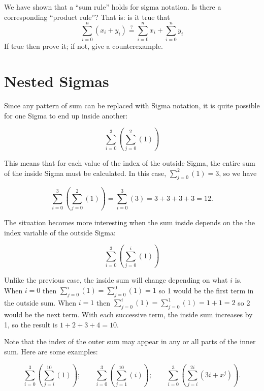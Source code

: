 \begin {exercise}{}
We have shown that a ``sum rule'' holds for sigma notation.  Is there a corresponding ``product rule''? That is: is it true that
\[ \sum_{i=0}^n \left(x_i +y_i \right) \stackrel{?}{=} \sum_{i=0}^n x_i + \sum_{i=0}^n y_i \]
If true then prove it; if not, give a counterexample.
\end{exercise}


\section{Nested Sigmas}
Since any pattern of sum can be replaced with Sigma notation, it is quite possible for one Sigma to end up inside another:

\[\sum_{i=0}^{3}\left( \sum_{j=0}^{2}(1)\right)\]

This means that for each value of the index of the outside Sigma, the entire sum of the inside Sigma must be calculated.  In this case, $\sum_{j=0}^{2}(1)=3$, so we have

\[\sum_{i=0}^{3}\left( \sum_{j=0}^{2}(1)\right) =  \sum_{i=0}^{3}\left( 3 \right) = 3+3+3+3 = 12. \]

The situation becomes more interesting when the sum inside depends on the the index variable of the outside Sigma:

\[\sum_{i=0}^{3}\left(\sum_{j=0}^{i}(1)\right)\]

Unlike the previous case, the inside sum will change depending on what $i$ is.  When $i=0$ then $\sum_{j=0}^{i}(1)=\sum_{j=0}^{0}(1)=1$ so 1 would be the first term in the outside sum.  When $i=1$ then $\sum_{j=0}^{i}(1)=\sum_{j=0}^{1}(1)=1+1=2$ so 2 would be the next term.  With each successive term, the inside sum increases by 1, so the result is $1+2+3+4 = 10$.

 Note that the index of the outer sum may appear in any or all parts of the inner sum. Here are some examples:  

\[\sum_{i=0}^{3} \left(\sum_{j=i}^{10}(1)\right); \qquad
\sum_{i=0}^{3} \left(\sum_{j=1}^{10}(i) \right); \qquad
\sum_{i=0}^{3}\left(\sum_{j=i}^{2i}(3i+x^j)\right).\]

